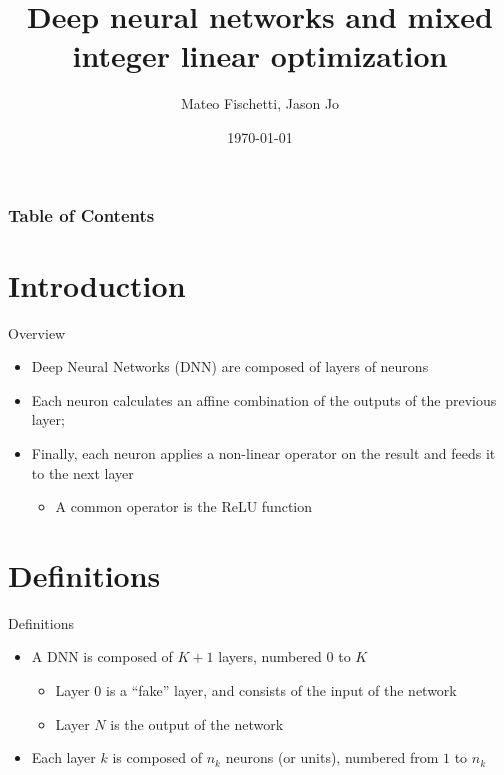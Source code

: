 \documentclass{beamer}
\title[DNN and MILP]{Deep neural networks and mixed integer linear optimization}
\author{Mateo Fischetti, Jason Jo}
\date{\today}
\begin{document}
\begin{frame}
\titlepage
\end{frame}

\begin{frame}
\frametitle{Table of Contents}
\tableofcontents
\end{frame}

\section{Introduction}
\begin{frame}{Overview}
  \begin{itemize}
  \item Deep Neural Networks (DNN) are composed of layers of neurons
  \item Each neuron calculates an affine combination of the outputs of the previous layer;
  \item Finally, each neuron applies a non-linear operator on the result and feeds it to the next layer
    \begin{itemize}
    \item A common operator is the ReLU function
    \end{itemize}
  \end{itemize}
\end{frame}

\section{Definitions}
\begin{frame}{Definitions}
  \begin{itemize}
  \item A DNN is composed of $K+1$ layers, numbered $0$ to $K$
    \begin{itemize}
    \item Layer $0$ is a ``fake'' layer, and consists of the input of the network
    \item Layer $N$ is the output of the network
    \end{itemize}
  \item Each layer $k$ is composed of $n_k$ neurons (or units), numbered from $1$ to $n_k$
  \end{itemize}
\end{frame}
\end{document}
